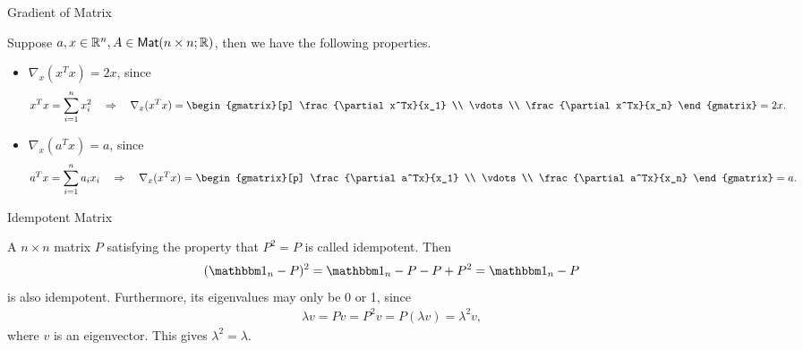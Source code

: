 \begin{frame}{Gradient of Matrix}

\justifying
{} Suppose $a, x\in \mathbb{R}^n, A\in \mathsf{Mat}(n\times n; \mathbb{R})$, then we have the following properties.
\begin{itemize}
	\item $\nabla_x (x^Tx) = 2x$, since
	\begin{align*}
	x^Tx & = \sum_{i=1}^n x_i^2 \quad\Rightarrow\quad \nabla_x (x^Tx) = 
	\begin{gmatrix}[p]
	\frac{\partial x^Tx}{x_1} \\ \vdots \\ \frac{\partial x^Tx}{x_n}
	\end{gmatrix} = 2x.
	\end{align*}
	\item $\nabla_x(a^Tx) = a$, since
	\begin{align*}
	a^Tx = \sum_{i=1}^n a_ix_i \quad\Rightarrow\quad \nabla_x (x^Tx) = 
	\begin{gmatrix}[p]
	\frac{\partial a^Tx}{x_1} \\ \vdots \\ \frac{\partial a^Tx}{x_n}
	\end{gmatrix} = a.
	\end{align*}
\end{itemize}


\end{frame}


\begin{frame}{Idempotent Matrix}

\justifying
{} A $n\times n$ matrix $P$ satisfying the property that $P^2 = P$ is called idempotent. Then
\begin{align*}
(\bbone_n - P)^2 = \bbone_n - P - P + P^2 = \bbone_n - P
\end{align*}
is also idempotent. Furthermore, its eigenvalues may only be 0 or 1, since
\begin{align*}
\lambda v = Pv = P^2v = P(\lambda v) = \lambda^2v,
\end{align*}
where $v$ is an eigenvector. This gives $\lambda^2 = \lambda$.

\end{frame}


